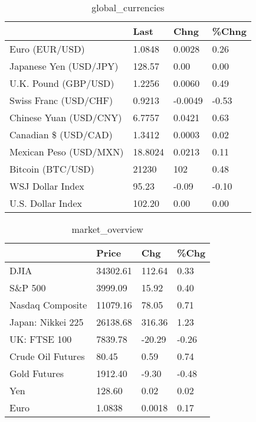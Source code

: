 \documentclass{article}%
\begin{document}
%


\begin{table}[htbp]%
\caption{global\_currencies}%
\centering%
\begin{adjustbox}{width=1\textwidth}%
\begin{tabular}{llll}
\toprule
                       &    Last &    Chng & \%Chng \\
\midrule
        Euro (EUR/USD) &  1.0848 &  0.0028 &  0.26 \\
Japanese Yen (USD/JPY) &  128.57 &    0.00 &  0.00 \\
  U.K. Pound (GBP/USD) &  1.2256 &  0.0060 &  0.49 \\
 Swiss Franc (USD/CHF) &  0.9213 & -0.0049 & -0.53 \\
Chinese Yuan (USD/CNY) &  6.7757 &  0.0421 &  0.63 \\
  Canadian \$ (USD/CAD) &  1.3412 &  0.0003 &  0.02 \\
Mexican Peso (USD/MXN) & 18.8024 &  0.0213 &  0.11 \\
     Bitcoin (BTC/USD) &   21230 &     102 &  0.48 \\
      WSJ Dollar Index &   95.23 &   -0.09 & -0.10 \\
     U.S. Dollar Index &  102.20 &    0.00 &  0.00 \\
\bottomrule
\end{tabular}
%
\end{adjustbox}%
\end{table}

%


\begin{table}[htbp]%
\caption{market\_overview}%
\centering%
\begin{adjustbox}{width=1\textwidth}%
\begin{tabular}{llll}
\toprule
                  &    Price &    Chg &  \%Chg \\
\midrule
             DJIA & 34302.61 & 112.64 &  0.33 \\
          S\&P 500 &  3999.09 &  15.92 &  0.40 \\
 Nasdaq Composite & 11079.16 &  78.05 &  0.71 \\
Japan: Nikkei 225 & 26138.68 & 316.36 &  1.23 \\
     UK: FTSE 100 &  7839.78 & -20.29 & -0.26 \\
Crude Oil Futures &    80.45 &   0.59 &  0.74 \\
     Gold Futures &  1912.40 &  -9.30 & -0.48 \\
              Yen &   128.60 &   0.02 &  0.02 \\
             Euro &   1.0838 & 0.0018 &  0.17 \\
\bottomrule
\end{tabular}
%
\end{adjustbox}%
\end{table}

%
\end{document}
